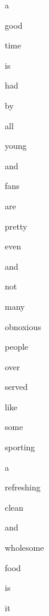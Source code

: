 \documentclass[varwidth]{standalone}
\begin{document}
 \begin{CJK*}{UTF8}{gbsn} 
{\setlength{\fboxsep}{0pt}\colorbox{white!0}{\parbox{0.9\textwidth}{
\colorbox{red!7.473897933959961}{\strut a} 
\colorbox{red!21.722850799560547}{\strut good} 
\colorbox{red!45.94023895263672}{\strut time} 
\colorbox{red!100.0}{\strut is} 
\colorbox{red!10.539003372192383}{\strut had} 
\colorbox{red!5.816175937652588}{\strut by} 
\colorbox{red!5.542795181274414}{\strut all} 
\colorbox{red!3.505075454711914}{\strut young} 
\colorbox{red!4.750371932983398}{\strut and} 
\colorbox{red!6.331907272338867}{\strut fans} 
\colorbox{red!2.625112533569336}{\strut are} 
\colorbox{red!0.0}{\strut pretty} 
\colorbox{red!3.0981075763702393}{\strut even} 
\colorbox{red!6.003317832946777}{\strut and} 
\colorbox{red!19.94458770751953}{\strut not} 
\colorbox{red!25.35171890258789}{\strut many} 
\colorbox{red!28.40199851989746}{\strut obnoxious} 
\colorbox{red!21.38412094116211}{\strut people} 
\colorbox{red!86.64575958251953}{\strut over} 
\colorbox{red!16.297847747802734}{\strut served} 
\colorbox{red!49.24380111694336}{\strut like} 
\colorbox{red!33.31942367553711}{\strut some} 
\colorbox{red!7.541772842407227}{\strut sporting} 
\colorbox{red!24.066654205322266}{\strut a} 
\colorbox{red!3.3127784729003906}{\strut refreshing} 
\colorbox{red!3.511315107345581}{\strut clean} 
\colorbox{red!8.22445011138916}{\strut and} 
\colorbox{red!21.953279495239258}{\strut wholesome} 
\colorbox{red!13.181381225585938}{\strut food} 
\colorbox{red!9.82727336883545}{\strut is} 
\colorbox{red!18.111604690551758}{\strut it} 

}}}\end{CJK*}
\end{document}
